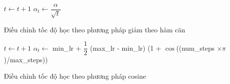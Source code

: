 \documentclass[14pt, a4paper]{article}
\theoremstyle{sltheorem}
\theoremstyle{soltheorem}
\begin{document}
\begin{algorithm}[h!]
    \DontPrintSemicolon
     {
        $t \gets t + 1$\;
        $\alpha_t \gets \dfrac{\alpha}{\sqrt{t}}$\;
    }
    \caption{Điều chỉnh tốc độ học theo phương pháp giảm theo hàm căn}
\end{algorithm}


\begin{algorithm}[h!]
    \DontPrintSemicolon
     {
        $t \gets t + 1$\;
        $\alpha_t \gets$ min\_lr + $\dfrac{1}{2}$ (max\_lr - min\_lr) (1 + $\cos$((num\_steps $\times \pi$)/max\_steps))\;
    }
    \caption{Điều chỉnh tốc độ học theo phương pháp cosine}
\end{algorithm}
\end{document}
